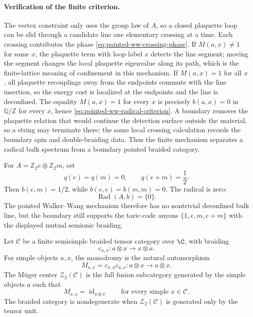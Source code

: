 \paragraph{Verification of the finite criterion.}
The vertex constraint only uses the group law of \(A\), so a closed plaquette
loop can be slid through a candidate line one elementary crossing at a time.
Each crossing contributes the phase
\eqref{eq:pointed-ww-crossing-phase}.  If \(M(a,x)\ne1\) for some \(x\), the
plaquette term with loop label \(x\) detects the line segment; moving the
segment changes the local plaquette eigenvalue along its path, which is the
finite-lattice meaning of confinement in this mechanism.  If \(M(a,x)=1\) for
all \(x\), all plaquette recouplings away from the endpoints commute with the
line insertion, so the energy cost is localized at the endpoints and the line
is deconfined.  The equality \(M(a,x)=1\) for every \(x\) is precisely
\(b(a,x)=0\) in \(\mathbb Q/\mathbb Z\) for every \(x\), hence
\eqref{eq:pointed-ww-radical-criterion}.  A boundary removes the plaquette
relation that would continue the detection surface outside the material, so a
string may terminate there; the same local crossing calculation records the
boundary spin and double-braiding data.  Thus the finite mechanism separates a
radical bulk spectrum from a boundary pointed braided category.

\begin{example}
\label{ex:toric-code-walker-wang-boundary}
For \(A=\mathbb Z_2e\oplus\mathbb Z_2m\), set
\[
  q(e)=q(m)=0,\qquad q(e+m)=\frac12 .
\]
Then \(b(e,m)=1/2\), while \(b(e,e)=b(m,m)=0\).  The radical is zero:
\[
  \operatorname{Rad}(A,b)=\{0\}.
\]
The pointed Walker--Wang mechanism therefore has no nontrivial deconfined
bulk line, but the boundary still supports the toric-code anyons
\(\{1,e,m,e+m\}\) with the displayed mutual semionic braiding.
\end{example}

\begin{definition}
\label{def:muger-center-braided-input}
Let \(\mathcal C\) be a finite semisimple braided tensor category over
\(\C\), with braiding
\[
  c_{a,x}:a\otimes x\longrightarrow x\otimes a .
\]
For simple objects \(a,x\), the monodromy is the natural automorphism
\[
  M_{a,x}=c_{x,a}c_{a,x}:a\otimes x\longrightarrow a\otimes x .
\]
The M\"uger center \(\mathcal Z_2(\mathcal C)\) is the full fusion
subcategory generated by the simple objects \(a\) such that
\begin{equation}
  M_{a,x}=\operatorname{id}_{a\otimes x}
  \qquad\text{for every simple }x\in\mathcal C .
  \label{eq:muger-center-definition}
\end{equation}
The braided category is nondegenerate when
\(\mathcal Z_2(\mathcal C)\) is generated only by the tensor unit.
\end{definition}

